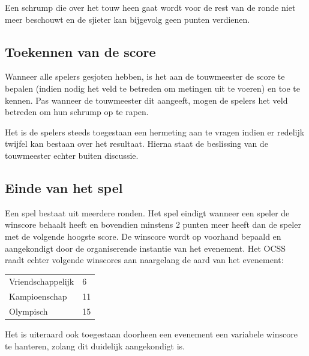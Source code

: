 \documentclass[a4paper,12pt,titlepage]{article}
\begin{document}
Een schrump die over het touw heen gaat wordt voor de rest van de ronde niet meer beschouwt en de sjieter kan bijgevolg geen punten verdienen.

\subsection{Toekennen van de score}

Wanneer alle spelers gesjoten hebben, is het aan de touwmeester de score te bepalen (indien nodig het veld te betreden om metingen uit te voeren) en toe te kennen. Pas wanneer de touwmeester dit aangeeft, mogen de spelers
het veld betreden om hun schrump op te rapen.

Het is de spelers steeds toegestaan een hermeting aan te vragen indien er redelijk twijfel kan bestaan over het resultaat. Hierna staat de beslissing van de touwmeester echter buiten discussie.

\subsection{Einde van het spel}

Een spel bestaat uit meerdere ronden. Het spel eindigt wanneer een speler de winscore behaalt heeft en bovendien minstens 2 punten meer heeft dan de speler met de volgende hoogste score. De winscore wordt op voorhand
bepaald en aangekondigt door de organiserende instantie van het evenement. Het OCSS raadt echter volgende winscores aan naargelang de aard van het evenement:

\vspace{10mm}

\begin{table}[h]
\centering
\begin{tabular}{l|l}
Vriendschappelijk & 6 \\
Kampioenschap & 11 \\
Olympisch & 15 \\
\end{tabular}
\end{table}

\vspace{10mm}

Het is uiteraard ook toegestaan doorheen een evenement een variabele winscore te hanteren, zolang dit duidelijk aangekondigt is.
\end{document}
